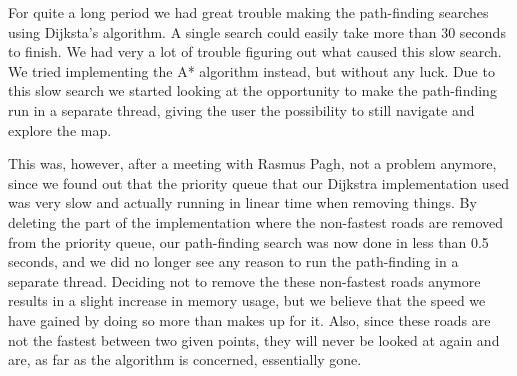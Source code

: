 For quite a long period we had great trouble making the path-finding searches using Dijksta's algorithm. A single search could easily take more than 30 seconds to finish. We had very a lot of trouble figuring out what caused this slow search. We tried implementing the A* algorithm instead, but without any luck. Due to this slow search we started looking at the opportunity to make the path-finding run in a separate thread, giving the user the possibility to still navigate and explore the map. 

This was, however, after a meeting with Rasmus Pagh, not a problem anymore, since we found out that the priority queue that our Dijkstra implementation used was very slow and actually running in linear time when removing things. By deleting the part of the implementation where the non-fastest roads are removed from the priority queue, our path-finding search was now done in less than 0.5 seconds, and we did no longer see any reason to run the path-finding in a separate thread. Deciding not to remove the these non-fastest roads anymore results in a slight increase in memory usage, but we believe that the speed we have gained by doing so more than makes up for it. Also, since these roads are not the fastest between two given points, they will never be looked at again and are, as far as the algorithm is concerned, essentially gone.